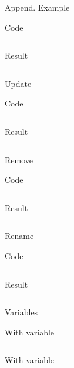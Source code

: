 \documentclass[sans]{beamer}
\begin{document}
\begin{frame}{Append. Example}
	\begin{block}{Code}
		\inputminted[fontsize=\footnotesize]{xml}{codes/ex14.xml}
	\end{block}
	\begin{block}{Result}
		\inputminted[fontsize=\footnotesize]{xml}{codes/ex15.xml}
	\end{block}	
\end{frame}

\begin{frame}{Update}
	\begin{block}{Code}
		\inputminted[fontsize=\footnotesize]{xml}{codes/ex16.xml}
	\end{block}
	\begin{block}{Result}
		\inputminted[fontsize=\footnotesize]{xml}{codes/ex17.xml}
	\end{block}
\end{frame}

\begin{frame}{Remove}
	\begin{block}{Code}
		\inputminted[fontsize=\footnotesize]{xml}{codes/ex18.xml}
	\end{block}
	\begin{block}{Result}
		\inputminted[fontsize=\footnotesize]{xml}{codes/ex19.xml}
	\end{block}		
\end{frame}

\begin{frame}{Rename}
	\begin{block}{Code}
		\inputminted[fontsize=\footnotesize]{xml}{codes/ex20.xml}
	\end{block}
	\begin{block}{Result}
		\inputminted[fontsize=\footnotesize]{xml}{codes/ex21.xml}
	\end{block}		
\end{frame}

\begin{frame}{Variables}
	\begin{block}{With variable}
		\inputminted[fontsize=\tiny]{xml}{codes/ex22.xml}
	\end{block}
	\begin{block}{With variable}
		\inputminted[fontsize=\tiny]{xml}{codes/ex23.xml}
	\end{block}		
\end{frame}
\end{document}
